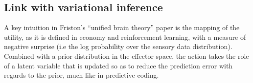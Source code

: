 \documentclass[runningheads]{llncs}
\begin{document}




\subsection{Link with variational inference}
A key intuition in Friston's  ``unified brain theory'' paper \cite{friston2010free} is the mapping of the utility, as it is defined in economy and reinforcement learning, with a measure of negative surprise (i.e the log probability over the sensory data distribution). Combined with a prior distribution in the effector space, the action takes the role of a latent variable that is updated so as to reduce the prediction error with regards to the prior, much like in predictive coding. 
\end{document}
